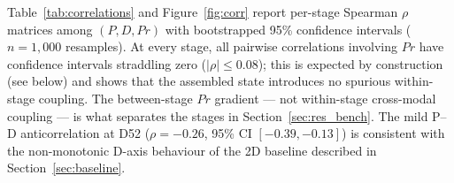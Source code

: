 \documentclass[5p,times,twocolumn]{elsarticle}
\newcommand{\rtag}[1]{}
\newcommand{\rev}[2]{\rtag{#1}#2}
\begin{document}
\begin{table}[!htbp]
  \caption{%
    Trajectory coherence
    $C^{(i)} = \cos(\mathbf{s}_{30} - \mathbf{s}_{11},\;
  \mathbf{s}_{52} - \mathbf{s}_{30})$, reported as a structural
    sanity check ($n = 200$ trajectories). The stochastic-$Pr$
    row is the meaningful one; the deterministic-$Pr$ row reaches
    the $+1$ ceiling by construction because $Pr$ is monotone
    across stages.}
  \label{tab:coherence}
  \centering
\end{table}

Table~\ref{tab:correlations} and Figure~\ref{fig:corr} report
per-stage Spearman $\rho$ matrices among $(P, D, Pr)$ with
bootstrapped 95\% confidence intervals ($n = 1{,}000$ resamples).
At every stage, all pairwise correlations involving $Pr$ have
confidence intervals straddling zero ($|\rho| \leq 0.08$)\rev{AC}{;
  this is expected by construction (see below) and shows that the
  assembled state introduces no spurious within-stage coupling.
  The} between-stage $Pr$ gradient --- not
within-stage cross-modal coupling --- is what separates the
stages in Section~\ref{sec:res_bench}.
The mild P--D anticorrelation at D52 ($\rho = -0.26$,
95\% CI $[-0.39, -0.13]$) is consistent with the non-monotonic
D-axis behaviour of the 2D baseline described in
Section~\ref{sec:baseline}.
\end{document}
